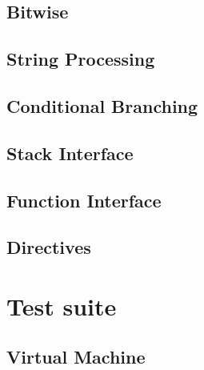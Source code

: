 \documentclass[manuscript,screen,nonacm]{acmart}
\begin{document}
\subsection{Bitwise}
\subsection{String Processing}
\subsection{Conditional Branching}
\subsection{Stack Interface}
\subsection{Function Interface}
\subsection{Directives}

\section{Test suite}
\subsection{Virtual Machine}
\end{document}
